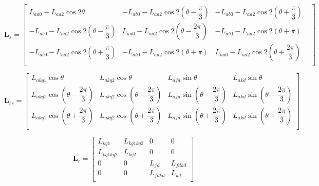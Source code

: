 \begin{equation}
	\mathbf{L}_s
	=
	\begin{bmatrix}
		L_{aa0} - L_{aa2} \cos 2 \theta &
		-L_{ab0} - L_{aa2} \cos 2(\theta - \dfrac{\pi}{3}) &
		-L_{ab0} - L_{aa2}\cos 2(\theta + \dfrac{\pi}{3}) &\\[6pt]
		-L_{ab0} - L_{aa2} \cos 2(\theta - \dfrac{\pi}{3}) &
		L_{aa0} - L_{aa2} \cos 2(\theta - \dfrac{2 \pi}{3})&
		-L_{ab0} - L_{aa2}\cos 2(\theta + \pi) \\[6pt]
		-L_{ab0} - L_{aa2} \cos 2(\theta + \dfrac{\pi}{3}) &
		-L_{ab0} - L_{aa2} \cos 2(\theta + \pi)&
		L_{aa0} - L_{aa2}\cos 2(\theta + \dfrac{2 \pi}{3}) \\[6pt]
	\end{bmatrix}
\end{equation}

\begin{equation}
	\mathbf{L}_{rs}
	=
	\begin{bmatrix}
		L_{akq1} \cos \theta &
		L_{akq2} \cos \theta &
		L_{afd} \sin \theta &
		L_{akd} \sin \theta \\[6pt]
		L_{akq1} \cos (\theta - \dfrac{2 \pi}{3}) &
		L_{akq2} \cos (\theta - \dfrac{2 \pi}{3}) &
		L_{afd} \sin (\theta - \dfrac{2 \pi}{3}) &
		L_{akd} \sin (\theta - \dfrac{2 \pi}{3}) \\[6pt]
		L_{akq1} \cos (\theta + \dfrac{2 \pi}{3}) &
		L_{akq2} \cos (\theta + \dfrac{2 \pi}{3}) &
		L_{afd} \sin (\theta + \dfrac{2 \pi}{3}) &
		L_{akd} \sin (\theta + \dfrac{2 \pi}{3}) \\[6pt]
	\end{bmatrix}
\end{equation}

\begin{equation}
	\mathbf{L}_r
	=
	\begin{bmatrix}
		L_{kq1} & L_{kq1kq2} & 0 & 0 \\  
		L_{kq1kq2} & L_{kq2} & 0 & 0 \\ 
		0 & 0 & L_{fd} & L_{fdkd} \\
		0 & 0 & L_{fdkd} & L_{kd} \\  
	\end{bmatrix}
\end{equation}

